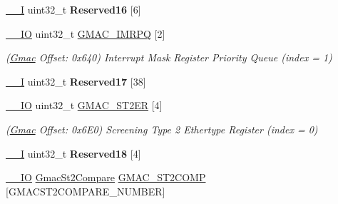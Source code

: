 \begin{DoxyCompactItemize}
\mbox{\label{structGmac_af1c4846f6ec6e0db1c958c47e4cc01fa}} 
\mbox{\hyperlink{core__cm7_8h_af63697ed9952cc71e1225efe205f6cd3}{\+\_\+\+\_\+I}} uint32\+\_\+t {\bfseries Reserved16} \mbox{[}6\mbox{]}
\item 
\mbox{\label{structGmac_a40da39d6b85025b5d0d4e8dd108826ba}} 
\mbox{\hyperlink{core__cm7_8h_aec43007d9998a0a0e01faede4133d6be}{\+\_\+\+\_\+\+IO}} uint32\+\_\+t \mbox{\hyperlink{structGmac_a40da39d6b85025b5d0d4e8dd108826ba}{G\+M\+A\+C\+\_\+\+I\+M\+R\+PQ}} \mbox{[}2\mbox{]}
\begin{DoxyCompactList}\small\item\em (\mbox{\hyperlink{structGmac}{Gmac}} Offset\+: 0x640) Interrupt Mask Register Priority Queue (index = 1) \end{DoxyCompactList}\item 
\mbox{\label{structGmac_ab7ebbdcccdf002555cbc6dc0c60241d6}} 
\mbox{\hyperlink{core__cm7_8h_af63697ed9952cc71e1225efe205f6cd3}{\+\_\+\+\_\+I}} uint32\+\_\+t {\bfseries Reserved17} \mbox{[}38\mbox{]}
\item 
\mbox{\label{structGmac_a607fb58ab40e0ed934a0e52e5c7b869a}} 
\mbox{\hyperlink{core__cm7_8h_aec43007d9998a0a0e01faede4133d6be}{\+\_\+\+\_\+\+IO}} uint32\+\_\+t \mbox{\hyperlink{structGmac_a607fb58ab40e0ed934a0e52e5c7b869a}{G\+M\+A\+C\+\_\+\+S\+T2\+ER}} \mbox{[}4\mbox{]}
\begin{DoxyCompactList}\small\item\em (\mbox{\hyperlink{structGmac}{Gmac}} Offset\+: 0x6\+E0) Screening Type 2 Ethertype Register (index = 0) \end{DoxyCompactList}\item 
\mbox{\label{structGmac_af6585d5ab9c0e340a329a5cd9d099a1c}} 
\mbox{\hyperlink{core__cm7_8h_af63697ed9952cc71e1225efe205f6cd3}{\+\_\+\+\_\+I}} uint32\+\_\+t {\bfseries Reserved18} \mbox{[}4\mbox{]}
\item 
\mbox{\label{structGmac_ac062fbf3e705e29e634629af94c9f117}} 
\mbox{\hyperlink{core__cm7_8h_aec43007d9998a0a0e01faede4133d6be}{\+\_\+\+\_\+\+IO}} \mbox{\hyperlink{structGmacSt2Compare}{Gmac\+St2\+Compare}} \mbox{\hyperlink{structGmac_ac062fbf3e705e29e634629af94c9f117}{G\+M\+A\+C\+\_\+\+S\+T2\+C\+O\+MP}} \mbox{[}G\+M\+A\+C\+S\+T2\+C\+O\+M\+P\+A\+R\+E\+\_\+\+N\+U\+M\+B\+ER\mbox{]}

\end{DoxyCompactItemize}
